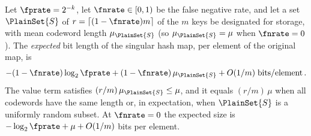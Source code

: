 \documentclass[ ../main.tex]{subfiles}
\begin{document}
\begin{theorem}
\label{thm:shm-space}
Let $\fprate = 2^{-k}$, let $\fnrate \in [0,1)$ be the false negative rate, and let a set $\PlainSet{S}$ of $r = \lceil (1-\fnrate) m \rceil$ of the $m$ keys be designated for storage, with mean codeword length $\mu_{\PlainSet{S}}$ (so $\mu_{\PlainSet{S}} = \mu$ when $\fnrate = 0$).
The \emph{expected} bit length of the singular hash map, per element of the original map, is
\begin{equation}
    -(1 - \fnrate) \log_2 \fprate + (1 - \fnrate)\, \mu_{\PlainSet{S}} + O(1/m) \; \si{bits \per element}\,.
\end{equation}
The value term satisfies $(r/m)\,\mu_{\PlainSet{S}} \leq \mu$, and it equals $(r/m)\,\mu$ when all codewords have the same length or, in expectation, when $\PlainSet{S}$ is a uniformly random subset.
At $\fnrate = 0$ the expected size is $-\log_2 \fprate + \mu + O(1/m)$ bits per element.
\end{theorem}
\end{document}
